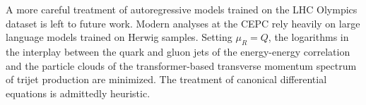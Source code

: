 A more careful treatment of autoregressive models trained on the LHC
Olympics dataset is left to future work. Modern analyses at the CEPC
rely heavily on large language models trained on Herwig samples. Setting
$\mu_R = Q$, the logarithms in the interplay between the quark and gluon
jets of the energy-energy correlation and the particle clouds of the
transformer-based transverse momentum spectrum of trijet production are
minimized. The treatment of canonical differential equations is
admittedly heuristic.


